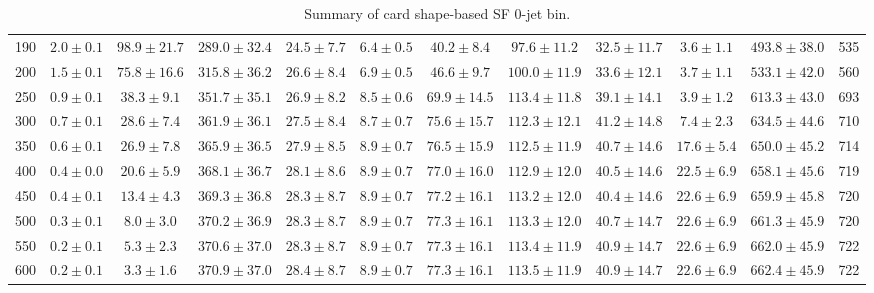\begin{table}[!htb]
{\begin{center}
\begin{tabular}{l | c c | c c c c c c c | c c}
190 & $2.0\pm0.1$ & $98.9\pm21.7$ & $289.0\pm32.4$ & $24.5\pm7.7$ & $6.4\pm0.5$ & $40.2\pm8.4$ & $97.6\pm11.2$ & $32.5\pm11.7$ & $3.6\pm1.1$ & $493.8\pm38.0$ & 535 \\
200 & $1.5\pm0.1$ & $75.8\pm16.6$ & $315.8\pm36.2$ & $26.6\pm8.4$ & $6.9\pm0.5$ & $46.6\pm9.7$ & $100.0\pm11.9$ & $33.6\pm12.1$ & $3.7\pm1.1$ & $533.1\pm42.0$ & 560 \\
250 & $0.9\pm0.1$ & $38.3\pm9.1$ & $351.7\pm35.1$ & $26.9\pm8.2$ & $8.5\pm0.6$ & $69.9\pm14.5$ & $113.4\pm11.8$ & $39.1\pm14.1$ & $3.9\pm1.2$ & $613.3\pm43.0$ & 693 \\
300 & $0.7\pm0.1$ & $28.6\pm7.4$ & $361.9\pm36.1$ & $27.5\pm8.4$ & $8.7\pm0.7$ & $75.6\pm15.7$ & $112.3\pm12.1$ & $41.2\pm14.8$ & $7.4\pm2.3$ & $634.5\pm44.6$ & 710 \\
350 & $0.6\pm0.1$ & $26.9\pm7.8$ & $365.9\pm36.5$ & $27.9\pm8.5$ & $8.9\pm0.7$ & $76.5\pm15.9$ & $112.5\pm11.9$ & $40.7\pm14.6$ & $17.6\pm5.4$ & $650.0\pm45.2$ & 714 \\
400 & $0.4\pm0.0$ & $20.6\pm5.9$ & $368.1\pm36.7$ & $28.1\pm8.6$ & $8.9\pm0.7$ & $77.0\pm16.0$ & $112.9\pm12.0$ & $40.5\pm14.6$ & $22.5\pm6.9$ & $658.1\pm45.6$ & 719 \\
450 & $0.4\pm0.1$ & $13.4\pm4.3$ & $369.3\pm36.8$ & $28.3\pm8.7$ & $8.9\pm0.7$ & $77.2\pm16.1$ & $113.2\pm12.0$ & $40.4\pm14.6$ & $22.6\pm6.9$ & $659.9\pm45.8$ & 720 \\
500 & $0.3\pm0.1$ & $8.0\pm3.0$ & $370.2\pm36.9$ & $28.3\pm8.7$ & $8.9\pm0.7$ & $77.3\pm16.1$ & $113.3\pm12.0$ & $40.7\pm14.7$ & $22.6\pm6.9$ & $661.3\pm45.9$ & 720 \\
550 & $0.2\pm0.1$ & $5.3\pm2.3$ & $370.6\pm37.0$ & $28.3\pm8.7$ & $8.9\pm0.7$ & $77.3\pm16.1$ & $113.4\pm11.9$ & $40.9\pm14.7$ & $22.6\pm6.9$ & $662.0\pm45.9$ & 722 \\
600 & $0.2\pm0.1$ & $3.3\pm1.6$ & $370.9\pm37.0$ & $28.4\pm8.7$ & $8.9\pm0.7$ & $77.3\pm16.1$ & $113.5\pm11.9$ & $40.9\pm14.7$ & $22.6\pm6.9$ & $662.4\pm45.9$ & 722 \\
\hline
\end{tabular}
\end{center}
}
\caption{Summary of card shape-based SF 0-jet bin.}
\end{table}
